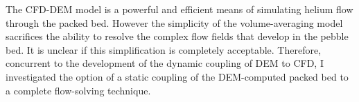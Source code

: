 The CFD-DEM model is a powerful and efficient means of simulating helium flow through the packed bed. However the simplicity of the volume-averaging model sacrifices the ability to resolve the complex flow fields that develop in the pebble bed. It is unclear if this simplification is completely acceptable. Therefore, concurrent to the development of the dynamic coupling of DEM to CFD, I investigated the option of a static coupling of the DEM-computed packed bed to a complete flow-solving technique.